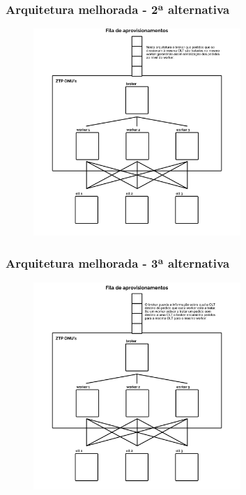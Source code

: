 \begin{frame}
    \frametitle{Arquitetura melhorada - 2ª alternativa}
    \begin{figure}
        \includegraphics[width=0.7\textwidth]{./assets/gestao_de_filas/arquitetura_algoritmo_3.png}
    \end{figure}    
\end{frame}

\begin{frame}
    \frametitle{Arquitetura melhorada - 3ª alternativa}
    \begin{figure}
        \includegraphics[width=0.7\textwidth]{./assets/gestao_de_filas/arquitetura_algoritmo_4.png}
    \end{figure}
\end{frame}

